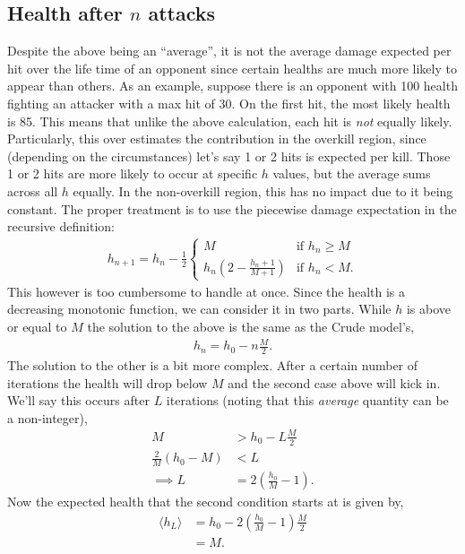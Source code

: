 		\subsection{Health after \texorpdfstring{$n$}{} attacks}
			Despite the above being an ``average'', it is not the average damage expected per hit over the life time of an opponent since certain healths are much more likely to appear than others. As an example, suppose there is an opponent with 100 health fighting an attacker with a max hit of 30. On the first hit, the most likely health is 85. This means that unlike the above calculation, each hit is \emph{not} equally likely. Particularly, this over estimates the contribution in the overkill region, since (depending on the circumstances) let's say 1 or 2 hits is expected per kill. Those 1 or 2 hits are more likely to occur at specific $h$ values, but the average sums across all $h$ equally. In the non-overkill region, this has no impact due to it being constant. The proper treatment is to use the piecewise damage expectation in the recursive definition:
			\begin{align}
				h_{n+1} = h_{n} - \frac{1}{2}\begin{cases}
					M &\text{if $h_n \ge M$} \\
					h_n\left(2 - \frac{h_n + 1}{M+1}\right) &\text{if $h_n < M$}.
				\end{cases}
			\end{align}
			This however is too cumbersome to handle at once. Since the health is a decreasing monotonic function, we can consider it in two parts. While $h$ is above or equal to $M$ the solution to the above is the same as the Crude model's,
			\begin{align}
				h_n = h_0 - n\frac{M}{2}.\label{eq:h_crude}
			\end{align}
			The solution to the other is a bit more complex. After a certain number of iterations the health will drop below $M$ and the second case above will kick in. We'll say this occurs after $L$ iterations (noting that this \emph{average} quantity can be a non-integer),
			\begin{align}
				M &> h_0 - L\frac{M}{2} \\
				\frac{2}{M}(h_0 - M) &< L \\
				\implies L &= 2\left(\frac{h_0}{M} - 1\right).
			\end{align}
			Now the expected health that the second condition starts at is given by,
			\begin{align}
				\langle h_L \rangle &= h_0 - 2\left(\frac{h_0}{M} - 1\right) \frac{M}{2}\\
				&= M.
			\end{align}
